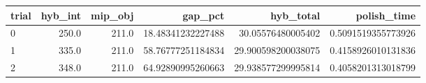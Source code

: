 \begin{tabular}{lrrrrr}
\hline
trial & hyb_int & mip_obj & gap_pct & hyb_total & polish_time \\ \hline
0 & 250.0 & 211.0 & 18.48341232227488 & 30.05576480005402 & 0.5091519355773926 \\
1 & 335.0 & 211.0 & 58.76777251184834 & 29.900598200038075 & 0.4158926010131836 \\
2 & 348.0 & 211.0 & 64.92890995260663 & 29.938577299995814 & 0.4058201313018799 \\
\hline
\end{tabular}
